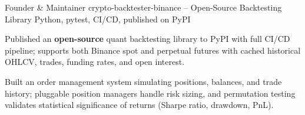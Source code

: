 

\begin{cventries}

  \cventry
    {Founder \& Maintainer} %
    {crypto-backtester-binance -- Open-Source Backtesting Library} %
    {Python, pytest, CI/CD, published on PyPI} %
    {} %
    {
      \begin{cvitems}
        \item {Published an \textbf{open-source} quant backtesting library to PyPI with full CI/CD pipeline; supports both Binance spot and perpetual futures with cached historical OHLCV, trades, funding rates, and open interest.}
        \item {Built an order management system simulating positions, balances, and trade history; pluggable position managers handle risk sizing, and permutation testing validates statistical significance of returns (Sharpe ratio, drawdown, PnL).}
      \end{cvitems}
    }

\end{cventries}
